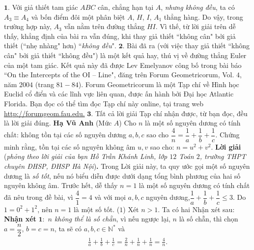 \begin{multicols}{2}
	\vskip 0.05cm
	$\pmb{1.}$ Với giả thiết tam giác $ABC$ cân, chẳng hạn tại $A$, \textit{nhưng không đều}, ta có  $A_3 \equiv A_4$ và bốn điểm đôi một phân biệt $A$, $H$, $I$, $A_1$  thẳng hàng. Do vậy, trong trường hợp này,  $A_3$ vẫn nằm trên đường thẳng $HI$. Vì thế, từ lời giải trên dễ thấy, khẳng định của bài ra vẫn đúng, khi thay giả thiết ``không cân" bởi giả thiết (``nhẹ nhàng" hơn) ``\textit{không đều}".
	\vskip 0.05cm
	$\pmb{2.}$ Bài đã ra (với việc thay giả thiết ``không cân" bởi giả thiết ``không đều") là một kết quả hay, thú vị về đường thẳng Euler của một tam giác. Kết quả này đã được Lev Emelyanov công bố trong bài báo ``On the Intercepts of the OI -- Line", đăng trên Forum Geometricorum, Vol. $4$, năm $2004$ (trang $81 - 84$).
	Forum Geometricorum là một Tạp chí về Hình học Euclid cổ điển và các lĩnh vực liên quan, được ấn hành bởi Đại học Atlantic Florida. Bạn đọc có thể tìm đọc Tạp chí này online, tại trang web \url{http://forumgeom.fau.edu.}
	\vskip 0.05cm
	$\pmb{3.}$ Tất cả lời giải Tạp chí nhận được, từ bạn đọc, đều là lời giải đúng.
	\vskip 0.05cm
	\hfill	\textbf{\color{thachthuctoanhoc}Hạ Vũ Anh}
	\vskip 0.05cm
	{}
	(Mức $A$) Cho $n$ là một số nguyên dương có tính chất: không tồn tại các số nguyên dương $a,b,c$ sao cho $\dfrac4n=\dfrac 1a+\dfrac 1b+\dfrac 1c.$ Chứng minh rằng, tồn tại các số nguyên không âm $u,v$ sao cho: $n=u^2+v^2$.  
	\vskip 0.05cm
	\textbf{\color{thachthuctoanhoc}Lời giải} (\textit{phỏng theo lời giải của bạn Hồ Trần Khánh Linh, lớp $12$ Toán $2$, trường THPT chuyên ĐHSP, ĐHSP Hà Nội})\textbf{\color{thachthuctoanhoc}.}
	\vskip 0.05cm
	Trong Lời giải này, ta quy ước gọi một số nguyên dương là \textit{số tốt}, nếu nó biểu diễn được dưới dạng tổng bình phương của hai số nguyên không âm.
	\vskip 0.05cm
	Trước hết, dễ thấy $n = 1$ là một số nguyên dương có tính chất đã nêu trong đề bài, vì $\dfrac{4}{1} = 4$ và với mọi $a, b, c$ nguyên dương,\linebreak $\dfrac{1}{a} + \dfrac{1}{b} + \dfrac{1}{c} \le 3$.
	\vskip 0.05cm
	Do  $1 = 0^2 + 1^2$, nên $n = 1$ là một số tốt. \hfill ($1$)
	\vskip 0.05cm
	Xét $n > 1$.
	\vskip 0.05cm
	Ta có hai Nhận xét sau:
	\vskip 0.05cm
	\textbf{\color{thachthuctoanhoc}Nhận xét} $\pmb{1:}$ \textit{$n$ không thể là số chẵn}, vì nếu ngược lại, $n$ là số chẵn, thì chọn  $a= \dfrac{n}{2}$, \linebreak$b = c = n$, ta sẽ có $a,b,c \in \mathbb{N^*}$  và
	\begin{align*}
		\frac{1}{a} + \frac{1}{b} + \frac{1}{c} 
		= \frac{2}{n} + \frac{1}{n} + \frac{1}{n} = \frac{4}{n}.

\end{align*}
\end{multicols}
